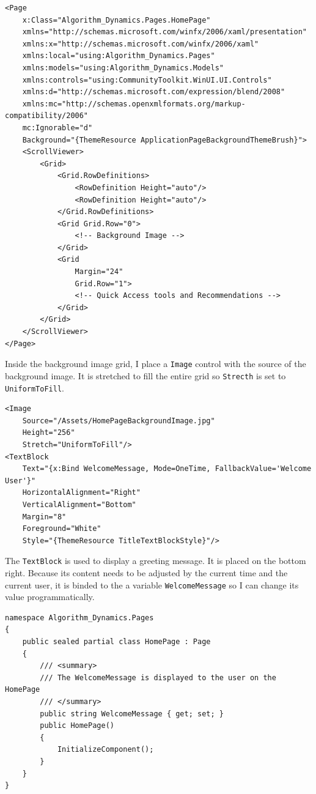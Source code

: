 \documentclass[a4paper]{report}
\begin{document}
\begin{verbatim}
<Page
    x:Class="Algorithm_Dynamics.Pages.HomePage"
    xmlns="http://schemas.microsoft.com/winfx/2006/xaml/presentation"
    xmlns:x="http://schemas.microsoft.com/winfx/2006/xaml"
    xmlns:local="using:Algorithm_Dynamics.Pages"
    xmlns:models="using:Algorithm_Dynamics.Models"
    xmlns:controls="using:CommunityToolkit.WinUI.UI.Controls"
    xmlns:d="http://schemas.microsoft.com/expression/blend/2008"
    xmlns:mc="http://schemas.openxmlformats.org/markup-compatibility/2006"
    mc:Ignorable="d"
    Background="{ThemeResource ApplicationPageBackgroundThemeBrush}">
    <ScrollViewer>
        <Grid>
            <Grid.RowDefinitions>
                <RowDefinition Height="auto"/>
                <RowDefinition Height="auto"/>
            </Grid.RowDefinitions>
            <Grid Grid.Row="0">
                <!-- Background Image -->
            </Grid>
            <Grid 
                Margin="24"
                Grid.Row="1">
                <!-- Quick Access tools and Recommendations -->
            </Grid>
        </Grid>
    </ScrollViewer>
</Page>
\end{verbatim}

Inside the background image grid, I place a \texttt{Image} control with the source of the background image. It is stretched to fill the entire grid so \texttt{Strecth} is set to \texttt{UniformToFill}.

\begin{verbatim}
<Image 
    Source="/Assets/HomePageBackgroundImage.jpg" 
    Height="256"
    Stretch="UniformToFill"/>
<TextBlock 
    Text="{x:Bind WelcomeMessage, Mode=OneTime, FallbackValue='Welcome User'}"
    HorizontalAlignment="Right"
    VerticalAlignment="Bottom"
    Margin="8"
    Foreground="White"
    Style="{ThemeResource TitleTextBlockStyle}"/>
\end{verbatim}

The \texttt{TextBlock} is used to display a greeting message. It is placed on the bottom right. Because its content needs to be adjusted by the current time and the current user, it is binded to the a variable \texttt{WelcomeMessage} so I can change its value programmatically.

\begin{verbatim}
namespace Algorithm_Dynamics.Pages
{
    public sealed partial class HomePage : Page
    {
        /// <summary>
        /// The WelcomeMessage is displayed to the user on the HomePage
        /// </summary>
        public string WelcomeMessage { get; set; }
        public HomePage()
        {
            InitializeComponent();
        }
    }
}
\end{verbatim}
\end{document}
